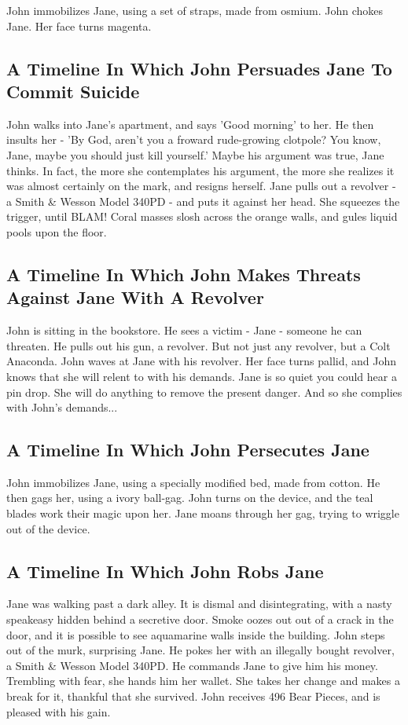 \documentclass{article}
\begin{document}
John immobilizes Jane, using a set of straps, made from osmium.
John chokes Jane.
Her face turns magenta.
\subsection{A Timeline In Which John Persuades Jane To Commit Suicide}


John walks into Jane's apartment, and says 'Good morning' to her.
He then insults her {-} 'By God, aren't you a froward rude{-}growing clotpole?
You know, Jane, maybe you should just kill yourself.'
Maybe his argument was true, Jane thinks.
In fact, the more she contemplates his argument, the more she realizes it was almost certainly on the mark, and resigns herself.
Jane pulls out a revolver {-} a Smith \& Wesson Model 340PD {-} and puts it against her head.
She squeezes the trigger, until BLAM!
Coral masses slosh across the orange walls, and gules liquid pools upon the floor.
\subsection{A Timeline In Which John Makes Threats Against Jane With A Revolver}


John is sitting in the bookstore.
He sees a victim {-} Jane {-} someone he can threaten. He pulls out his gun, a revolver.
But not just any revolver, but a Colt Anaconda.
John waves at Jane with his revolver. Her face turns pallid, and John knows that she will relent to with his demands.
Jane is so quiet you could hear a pin drop. She will do anything to remove the present danger. And so she complies with John's demands...
\subsection{A Timeline In Which John Persecutes Jane}


John immobilizes Jane, using a specially modified bed, made from cotton.
He then gags her, using a ivory ball{-}gag.
John turns on the device, and the teal blades work their magic upon her.
Jane moans through her gag, trying to wriggle out of the device.
\subsection{A Timeline In Which John Robs Jane}


Jane was walking past a dark alley.
It is dismal and disintegrating, with a nasty speakeasy hidden behind a secretive door.
Smoke oozes out out of a crack in the door, and it is possible to see aquamarine walls inside the building.
John steps out of the murk, surprising Jane.
He pokes her with an illegally bought revolver, a Smith \& Wesson Model 340PD.
He commands Jane to give him his money.
Trembling with fear, she hands him her wallet.
She takes her change and makes a break for it, thankful that she survived.
John receives 496 Bear Pieces, and is pleased with his gain.
\end{document}
